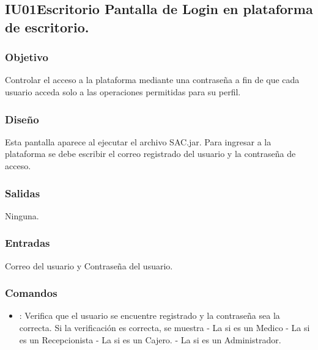 \subsection{IU01Escritorio Pantalla de Login en plataforma de escritorio.}

\subsubsection{Objetivo}
	Controlar el acceso a la plataforma mediante una contraseña a fin de que cada usuario acceda solo a las operaciones permitidas para su perfil.

\subsubsection{Diseño}
	Esta pantalla aparece al ejecutar el archivo SAC.jar. Para ingresar a la plataforma se debe escribir el correo registrado del usuario y la contraseña de acceso. 


\subsubsection{Salidas}

	Ninguna.

\subsubsection{Entradas}
Correo del usuario y Contraseña del usuario.

\subsubsection{Comandos}
\begin{itemize}
	\item {}: Verifica que el usuario se encuentre registrado y la contraseña sea la correcta. Si la verificación es correcta, se muestra 
	- La  si es un Medico
	- La  si es un Recepcionista
	- La  si es un Cajero.
	- La  si es un Administrador.
	
	
\end{itemize}

